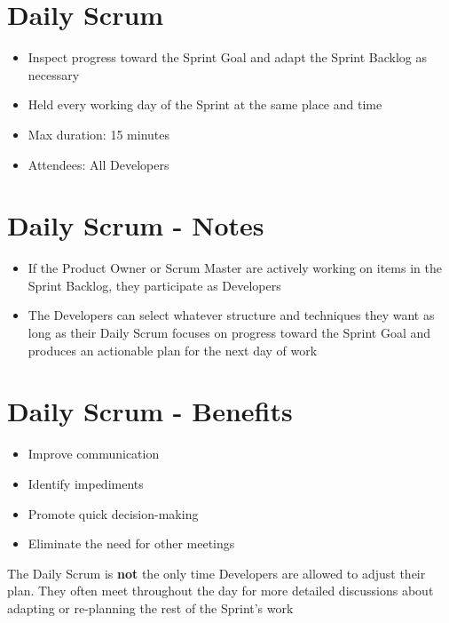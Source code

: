 \documentclass[a4paper,11pt,twocolumn]{article}
\begin{document}
\section*{Daily Scrum}
\begin{itemize}
	\item Inspect progress toward the Sprint Goal and adapt the Sprint Backlog as necessary
	\item Held every working day of the Sprint at the same place and time
	\item Max duration: 15 minutes
	\item Attendees: All Developers
\end{itemize}

\section*{Daily Scrum - Notes}
\begin{itemize}
	\item If the Product Owner or Scrum Master are actively working on items in the Sprint Backlog, they participate as Developers
	\item The Developers can select whatever structure and techniques they want as long as their Daily Scrum focuses on progress toward the Sprint Goal and produces an actionable plan for the next day of work
\end{itemize}

\section*{Daily Scrum - Benefits}
\begin{itemize}
	\item Improve communication
	\item Identify impediments
	\item Promote quick decision-making
	\item Eliminate the need for other meetings
\end{itemize}

\begin{tcolorbox}[colback=black!8!white,colframe=gray!50!black,title=Note,sharp corners,fonttitle=\normalsize\bfseries,fontupper=\normalsize,left=0.7em,right=0.7em]
	The Daily Scrum is \textbf{not} the only time Developers are allowed to adjust their plan. They often meet throughout the day for more detailed discussions about adapting or re-planning the rest of the Sprint's work
\end{tcolorbox}
\end{document}
